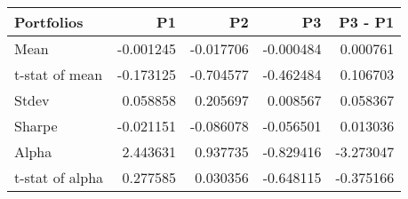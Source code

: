 \begin{tabular}{lrrrr}
\toprule
Portfolios & P1 & P2 & P3 & P3 - P1 \\
\midrule
Mean & -0.001245 & -0.017706 & -0.000484 & 0.000761 \\
t-stat of mean & -0.173125 & -0.704577 & -0.462484 & 0.106703 \\
Stdev & 0.058858 & 0.205697 & 0.008567 & 0.058367 \\
Sharpe & -0.021151 & -0.086078 & -0.056501 & 0.013036 \\
Alpha & 2.443631 & 0.937735 & -0.829416 & -3.273047 \\
t-stat of alpha & 0.277585 & 0.030356 & -0.648115 & -0.375166 \\
\bottomrule
\end{tabular}
